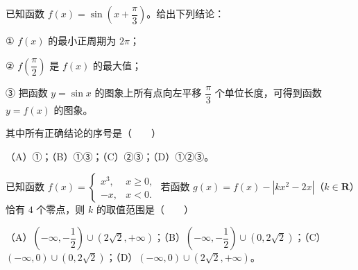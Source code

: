 \begin{question}
已知函数 $f(x)=\sin\left(x+\dfrac\pi3\right)$。给出下列结论：

① $f(x)$ 的最小正周期为 $2\pi$；

② $f\left(\dfrac\pi2\right)$ 是 $f(x)$ 的最大值；

③ 把函数 $y=\sin x$ 的图象上所有点向左平移 $\dfrac\pi3$ 个单位长度，可得到函数 $y=f(x)$ 的图象。

其中所有正确结论的序号是\mbox{（　　）}

（A）①；（B）①③；（C）②③；（D）①②③。

\end{question}
\begin{question}
已知函数 $f(x)=\begin{cases}x^3,&x\geqslant0,\\-x,&x<0.\end{cases}$ 若函数 $g(x)=f(x)-|kx^2-2x|$（$k\in\mathbf R$）恰有 $4$ 个零点，则 $k$ 的取值范围是\mbox{（　　）}

（A）$\left(-\infty,-\dfrac12\right)\cup\left(2\sqrt2,+\infty\right)$；（B）$\left(-\infty,-\dfrac12\right)\cup\left(0,2\sqrt2\right)$；（C）$(-\infty,0)\cup\left(0,2\sqrt2\right)$；（D）$(-\infty,0)\cup\left(2\sqrt2,+\infty\right)$。

\end{question}

